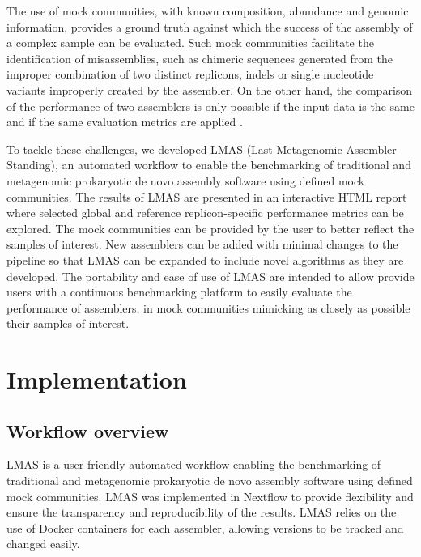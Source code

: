The use of mock communities, with known composition, abundance and genomic information, provides a ground truth against which the success of the assembly of a complex sample can be evaluated. Such mock communities facilitate the identification of misassemblies, such as chimeric sequences generated from the improper combination of two distinct replicons, indels or single nucleotide variants improperly created by the assembler. On the other hand, the comparison of the performance of two assemblers is only possible if the input data is the same and if the same evaluation metrics are applied \cite{sczyrba_critical_2017}. 

To tackle these challenges, we developed LMAS (Last Metagenomic Assembler Standing), an automated workflow to enable the benchmarking of traditional and metagenomic prokaryotic de novo assembly software using defined mock communities. The results of LMAS are presented in an interactive HTML report where selected global and reference replicon-specific performance metrics can be explored. The mock communities can be provided by the user to better reflect the samples of interest. New assemblers can be added with minimal changes to the pipeline so that LMAS can be expanded to include novel algorithms as they are developed. The portability and ease of use of LMAS are intended to allow provide users with a continuous benchmarking platform to easily evaluate the performance of assemblers, in mock communities mimicking as closely as possible their samples of interest.

\section{Implementation}

\subsection{Workflow overview}

LMAS is a user-friendly automated workflow enabling the benchmarking of traditional and metagenomic prokaryotic de novo assembly software using defined mock communities. LMAS was implemented in Nextflow \cite{di_tommaso_nextflow_2017} to provide flexibility and ensure the transparency and reproducibility of the results. LMAS relies on the use of Docker \cite{merkel_docker_2014} containers for each assembler, allowing versions to be tracked and changed easily.

